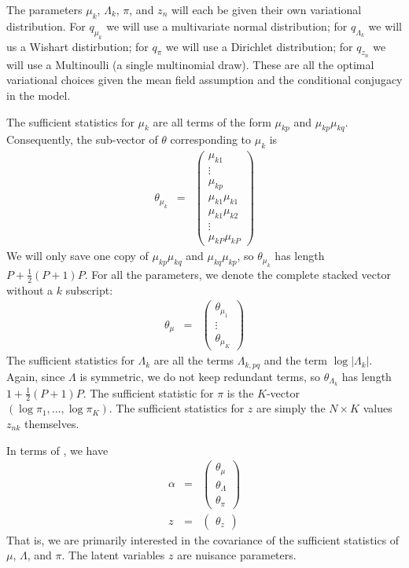The parameters $\mu_{k}$, $\Lambda_{k}$, $\pi$, and $z_{n}$ will
each be given their own variational distribution.  For $q_{\mu_k}$ we will
use a multivariate normal distribution; for $q_{\Lambda_{k}}$ we will
us a Wishart distirbution; for $q_{\pi}$ we will use a Dirichlet distribution;
for $q_{z_{n}}$ we will use a Multinoulli (a single multinomial draw).  These
are all the optimal variational choices given the mean field assumption and
the conditional conjugacy in the model.

The sufficient statistics for $\mu_{k}$ are all terms of the form
$\mu_{kp}$ and $\mu_{kp}\mu_{kq}$. Consequently, the sub-vector
of $\theta$ corresponding to $\mu_{k}$ is
%
\begin{eqnarray*}
\theta_{\mu_{k}} & = & \left(\begin{array}{c}
\mu_{k1}\\
\vdots\\
\mu_{kp}\\
\mu_{k1}\mu_{k1}\\
\mu_{k1}\mu_{k2}\\
\vdots\\
\mu_{kP}\mu_{kP}
\end{array}\right)
\end{eqnarray*}
%
We will only save one copy of $\mu_{kp}\mu_{kq}$ and $\mu_{kq}\mu_{kp}$,
so $\theta_{\mu_{k}}$ has length $P+\frac{1}{2}\left(P+1\right)P$.
For all the parameters, we denote the complete stacked vector without
a $k$ subscript:
%
\begin{eqnarray*}
\theta_{\mu} & = & \left(\begin{array}{c}
\theta_{\mu_{1}}\\
\vdots\\
\theta_{\mu_{K}}
\end{array}\right)
\end{eqnarray*}
%
The sufficient statistics for $\Lambda_{k}$ are all the terms $\Lambda_{k,pq}$
and the term $\log\left|\Lambda_{k}\right|$. Again, since $\Lambda$ is
symmetric, we do not keep redundant terms, so $\theta_{\Lambda_{k}}$ has length
$1+\frac{1}{2}\left(P+1\right)P$. The sufficient statistic for $\pi$ is the
$K$-vector $\left(\log\pi_{1},...,\log\pi_{K}\right)$. The sufficient statistics
for $z$ are simply the $N\times K$ values $z_{nk}$ themselves.

In terms of , we have
%
\begin{eqnarray*}
\alpha & = & \left(\begin{array}{c}
\theta_{\mu}\\
\theta_{\Lambda}\\
\theta_{\pi}
\end{array}\right)\\
z & = & \left(\begin{array}{c}
\theta_{z}\end{array}\right)
\end{eqnarray*}
%
That is, we are primarily interested in the covariance of the sufficient
statistics of $\mu$, $\Lambda$, and $\pi$.  The latent variables $z$ are
nuisance parameters.

